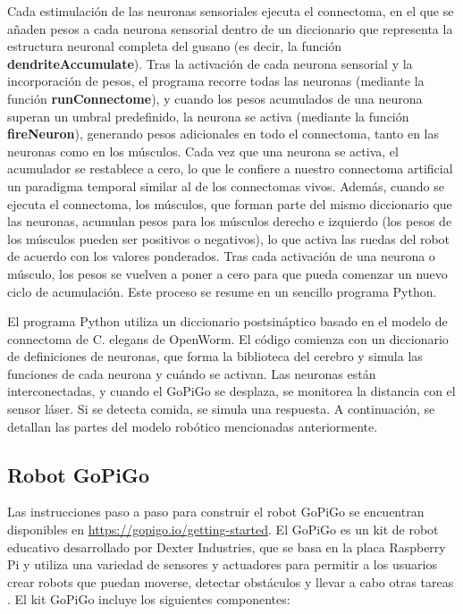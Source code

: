 Cada estimulación de las neuronas sensoriales ejecuta el connectoma, en el que se añaden pesos a cada neurona sensorial dentro de un diccionario que representa la estructura neuronal completa del gusano (es decir, la función \textbf{dendriteAccumulate}). Tras la activación de cada neurona sensorial y la incorporación de pesos, el programa recorre todas las neuronas (mediante la función \textbf{runConnectome}), y cuando los pesos acumulados de una neurona superan un umbral predefinido, la neurona se activa (mediante la función \textbf{fireNeuron}), generando pesos adicionales en todo el connectoma, tanto en las neuronas como en los músculos. Cada vez que una neurona se activa, el acumulador se restablece a cero, lo que le confiere a nuestro connectoma artificial un paradigma temporal similar al de los connectomas vivos. Además, cuando se ejecuta el connectoma, los músculos, que forman parte del mismo diccionario que las neuronas, acumulan pesos para los músculos derecho e izquierdo (los pesos de los músculos pueden ser positivos o negativos), lo que activa las ruedas del robot de acuerdo con los valores ponderados. Tras cada activación de una neurona o músculo, los pesos se vuelven a poner a cero para que pueda comenzar un nuevo ciclo de acumulación. Este proceso se resume en un sencillo programa Python.


El programa Python utiliza un diccionario postsináptico basado en el modelo de connectoma de C. elegans de OpenWorm. El código comienza con un diccionario de definiciones de neuronas, que forma la biblioteca del cerebro y simula las funciones de cada neurona y cuándo se activan. Las neuronas están interconectadas, y cuando el GoPiGo se desplaza, se monitorea la distancia con el sensor láser. Si se detecta comida, se simula una respuesta. A continuación, se detallan las partes del modelo robótico mencionadas anteriormente.


\subsection{Robot GoPiGo}

Las instrucciones paso a paso para construir el robot GoPiGo se encuentran disponibles en \url{https://gopigo.io/getting-started}. El GoPiGo es un kit de robot educativo desarrollado por Dexter Industries, que se basa en la placa Raspberry Pi y utiliza una variedad de sensores y actuadores para permitir a los usuarios crear robots que puedan moverse, detectar obstáculos y llevar a cabo otras tareas \cite{noauthor_dexter_nodate}. El kit GoPiGo incluye los siguientes componentes:


